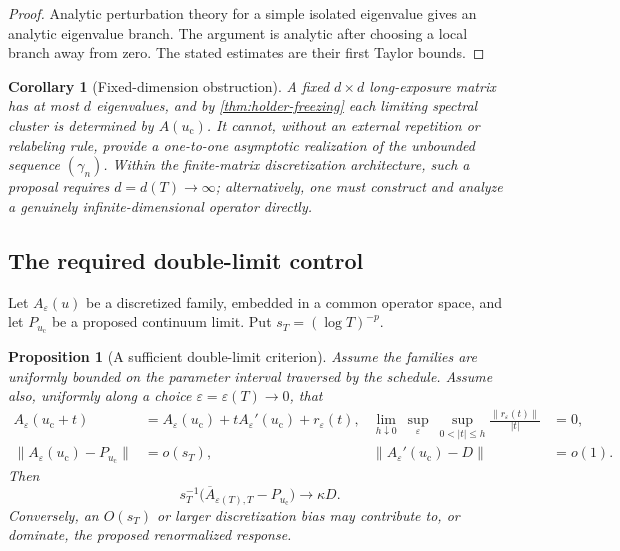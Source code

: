 \documentclass[11pt]{article}
\newtheorem{proposition}[theorem]{Proposition}
\newtheorem{corollary}[theorem]{Corollary}
\theoremstyle{definition}
\theoremstyle{remark}
\newcommand{\uc}{u_{\mathrm c}}
\begin{document}
\begin{proof}
Analytic perturbation theory for a simple isolated eigenvalue gives an analytic eigenvalue branch.  The argument is analytic after choosing a local branch away from zero.  The stated estimates are their first Taylor bounds.
\end{proof}

\begin{corollary}[Fixed-dimension obstruction]\label{cor:fixed-dimension}
A fixed $d\times d$ long-exposure matrix has at most $d$ eigenvalues, and by \cref{thm:holder-freezing} each limiting spectral cluster is determined by $A(\uc)$.  It cannot, without an external repetition or relabeling rule, provide a one-to-one asymptotic realization of the unbounded sequence $(\gamma_n)$.
Within the finite-matrix discretization architecture, such a proposal requires $d=d(T)\to\infty$; alternatively, one must construct and analyze a genuinely infinite-dimensional operator directly.
\end{corollary}

\subsection{The required double-limit control}

Let $A_\varepsilon(u)$ be a discretized family, embedded in a common operator space, and let $P_{\uc}$ be a proposed continuum limit.  Put $s_T=(\log T)^{-p}$.

\begin{proposition}[A sufficient double-limit criterion]\label{prop:double-limit}
Assume the families are uniformly bounded on the parameter interval traversed by the schedule.  Assume also, uniformly along a choice $\varepsilon=\varepsilon(T)\to0$, that
\begin{align}
    A_\varepsilon(\uc+t)
      &=A_\varepsilon(\uc)+tA_\varepsilon'(\uc)+r_\varepsilon(t),
      &\lim_{h\downarrow0}\ \sup_\varepsilon\ \sup_{0<|t|\le h}
       \frac{\|r_\varepsilon(t)\|}{|t|}&=0,
      \label{eq:uniform-diff}\\
    \|A_\varepsilon(\uc)-P_{\uc}\|&=o(s_T),
      &\|A_\varepsilon'(\uc)-D\|&=o(1).
      \label{eq:double-errors}
\end{align}
Then
\begin{equation}\label{eq:double-limit}
    s_T^{-1}\bigl(\overline A_{\varepsilon(T),T}-P_{\uc}\bigr)
    \longrightarrow\kappa D.
\end{equation}
Conversely, an $O(s_T)$ or larger discretization bias may contribute to, or dominate, the proposed renormalized response.
\end{proposition}
\end{document}

